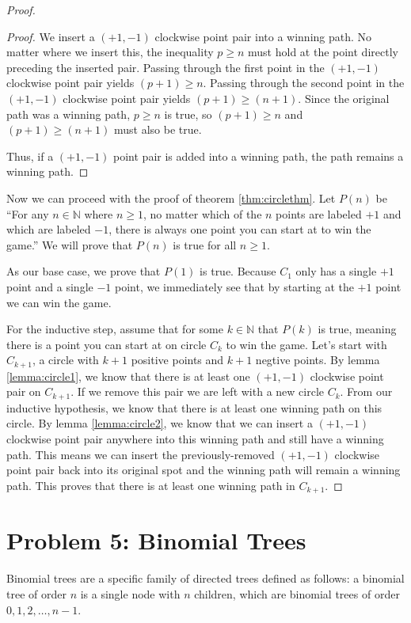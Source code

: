 \documentclass[10pt,letter]{article}
\begin{document}
\begin{proof}
\begin{proof}
We insert a $(+1, -1)$ clockwise point pair into a winning path. No matter where we insert this, the inequality $p \ge n$ must hold at the point directly preceding the inserted pair. Passing through the first point in the $(+1, -1)$ clockwise point pair yields $(p+1) \ge n$. Passing through the second point in the $(+1, -1)$ clockwise point pair yields $(p+1) \ge (n+1)$. Since the original path was a winning path, $p \ge n$ is true, so $(p+1) \ge n$ and $(p+1) \ge (n+1)$ must also be true.

Thus, if a $(+1, -1)$ point pair is added into a winning path, the path remains a winning path.
\end{proof}

Now we can proceed with the proof of theorem \ref{thm:circlethm}. Let $P(n)$ be ``For any $n \in \mathbb{N}$ where $n \ge 1$, no matter which of the $n$ points are labeled $+1$ and which are labeled $-1$, there is always one point you can start at to win the game.'' We will prove that $P(n)$ is true for all $n \ge 1$.

As our base case, we prove that $P(1)$ is true. Because $C_1$ only has a single $+1$ point and a single $-1$ point, we immediately see that by starting at the $+1$ point we can win the game.

For the inductive step, assume that for some $k \in \mathbb{N}$ that $P(k)$ is true, meaning there is a point you can start at on circle $C_k$ to win the game. Let's start with $C_{k+1}$, a circle with $k+1$ positive points and $k+1$ negtive points. By lemma \ref{lemma:circle1}, we know that there is at least one $(+1, -1)$ clockwise point pair on $C_{k+1}$. If we remove this pair we are left with a new circle $C_k$. From our inductive hypothesis, we know that there is at least one winning path on this circle. By lemma \ref{lemma:circle2}, we know that we can insert a $(+1, -1)$ clockwise point pair anywhere into this winning path and still have a winning path. This means we can insert the previously-removed $(+1, -1)$ clockwise point pair back into its original spot and the winning path will remain a winning path. This proves that there is at least one winning path in $C_{k+1}$. 
\end{proof}

\section*{Problem 5: Binomial Trees}
Binomial trees are a specific family of directed trees defined as follows: a binomial tree of order $n$ is a single node with $n$ children, which are binomial trees of order $0, 1, 2, \ldots, n-1$. 
\end{document}
